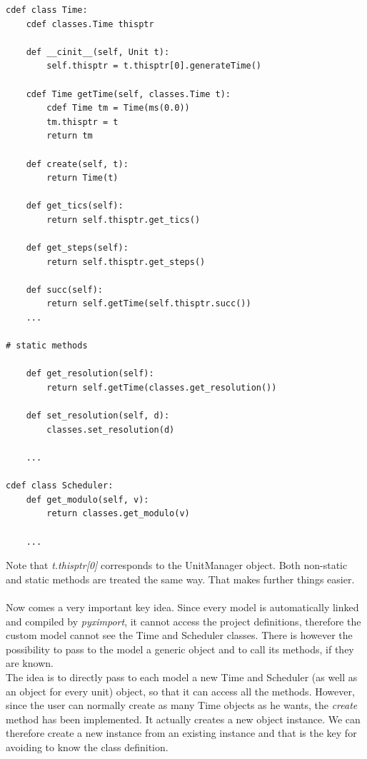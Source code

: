\documentclass{article}
\begin{document}
\begin{verbatim}
cdef class Time:
    cdef classes.Time thisptr

    def __cinit__(self, Unit t):
        self.thisptr = t.thisptr[0].generateTime()

    cdef Time getTime(self, classes.Time t):
        cdef Time tm = Time(ms(0.0))
        tm.thisptr = t
        return tm

    def create(self, t):
        return Time(t)

    def get_tics(self):
        return self.thisptr.get_tics()

    def get_steps(self):
        return self.thisptr.get_steps()

    def succ(self):
        return self.getTime(self.thisptr.succ()) 
    ...

# static methods

    def get_resolution(self):
        return self.getTime(classes.get_resolution())
        
    def set_resolution(self, d):
        classes.set_resolution(d)

    ...
        
cdef class Scheduler:
    def get_modulo(self, v):
        return classes.get_modulo(v)

    ...
\end{verbatim}
Note that \emph{t.thisptr[0]} corresponds to the UnitManager object. Both non-static and static methods are treated the same way. That makes further things easier. \\ \\

Now comes a very important key idea. Since every model is automatically linked and compiled by \emph{pyximport}, it cannot access the project definitions, therefore the custom model cannot see the Time and Scheduler classes. There is however the possibility to pass to the model a generic object and to call its methods, if they are known. \\
The idea is to directly pass to each model a new Time and Scheduler (as well as an object for every unit) object, so that it can access all the methods. However, since the user can normally create as many Time objects as he wants, the \emph{create} method has been implemented. It actually creates a new object instance. We can therefore create a new instance from an existing instance and that is the key for avoiding to know the class definition. \\ \\
\end{document}

